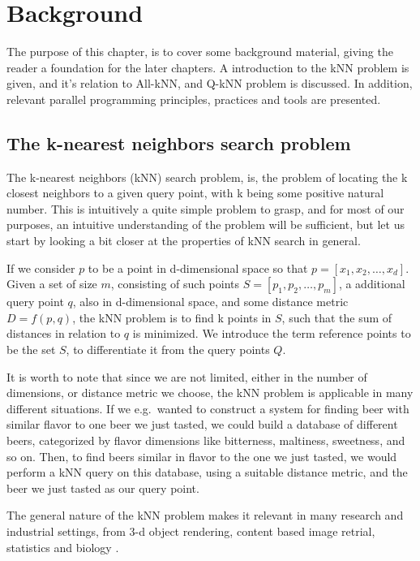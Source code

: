 \chapter{Background}

The purpose of this chapter, is to cover some background material, giving the reader a foundation for the later chapters. A introduction to the kNN problem is given, and it's relation to All-kNN, and Q-kNN problem is discussed. In addition, relevant parallel programming principles, practices and tools are presented.

\section{The k-nearest neighbors search problem} %
\label{a_short_introduction_to_kNN_search_problem}

The k-nearest neighbors (kNN) search problem, is, the problem of locating the k closest neighbors to a given query point, with k being some positive natural number. This is intuitively a quite simple problem to grasp, and for most of our purposes, an intuitive understanding of the problem will be sufficient, but let us start by looking a bit closer at the properties of kNN search in general.

If we consider $p$ to be a point in d-dimensional space so that $p = [x_1, x_2,\dots, x_d]$. Given a set of size $m$, consisting of such points $S = [p_1, p_2,\dots, p_m]$, a additional query point $q$, also in d-dimensional space, and some distance metric $D = f(p, q)$, the kNN problem is to find k points in $S$, such that the sum of distances in relation to $q$ is minimized. We introduce the term reference points to be the set $S$, to differentiate it from the query points $Q$. 

It is worth to note that since we are not limited, either in the number of dimensions, or distance metric we choose, the kNN problem is applicable in many different situations. If we e.g.\ wanted to construct a system for finding beer with similar flavor to one beer we just tasted, we could build a database of different beers, categorized by flavor dimensions like bitterness, maltiness, sweetness, and so on. Then, to find beers similar in flavor to the one we just tasted, we would perform a kNN query on this database, using a suitable distance metric, and the beer we just tasted as our query point.

The general nature of the kNN problem makes it relevant in many research and industrial settings, from 3-d object rendering, content based image retrial, statistics and biology \citep[Introduction]{Garcia2010}.

